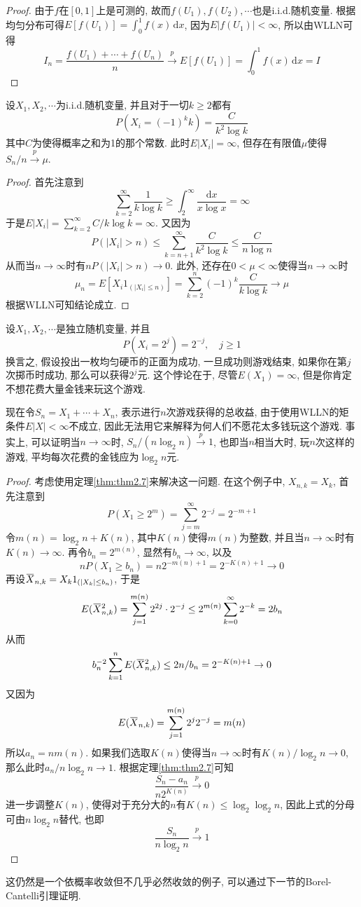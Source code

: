 \documentclass[cn, 12pt, math=mtpro2, bibstyle=apa, blue, twocol]{elegantbook}
\newcommand{\overbar}[1]{\mkern 1.5mu\overline{\mkern-1.5mu#1\mkern-1.5mu}\mkern 1.5mu}
\begin{document}
\begin{proof}
  由于$f$在$[0,1]$上是可测的, 故而$f(U_1),f(U_2),\cdots$也是i.i.d.随机变量. 根据均匀分布可得$E[f(U_1)]=\int_{0}^{1}f(x)\,\text{d}x$, 因为$E|f(U_1)|<\infty$, 所以由WLLN可得
  $$I_n=\frac{f(U_1)+\cdots+f(U_n)}{n}\xrightarrow{p} E[f(U_1)]=\int_{0}^{1}f(x)\,\text{d}x=I$$
\end{proof}
\begin{example}
设$X_1,X_2,\cdots$为i.i.d.随机变量, 并且对于一切$k\ge2$都有
$$P(X_i=(-1)^kk)=\frac{C}{k^2\log k}$$
其中$C$为使得概率之和为1的那个常数. 此时$E|X_i|=\infty$, 但存在有限值$\mu$使得$S_n/n\xrightarrow{p}\mu$.
\end{example}
\begin{proof}
  首先注意到
  $$\sum_{k=2}^{\infty}\frac{1}{k\log k}\geq \int_{2}^{\infty}\frac{\text{d}x}{x\log x}=\infty$$
  于是$E|X_i|=\sum_{k=2}^{\infty}C/k\log k=\infty$. 又因为
  $$P(|X_i|>n)\leq\sum_{k=n+1}^{\infty}\frac{C}{k^2\log k}\leq \frac{C}{n\log n}$$
  从而当$n\to\infty$时有$nP(|X_i|>n)\to0$. 此外, 还存在$0<\mu<\infty$使得当$n\to\infty$时
  $$\mu_n=E[X_i1_{(|X_i|\leq n)}]=\sum_{k=2}^{n}(-1)^k\frac{C}{k\log k}\to \mu$$
  根据WLLN可知结论成立.
\end{proof}

\begin{example}[圣彼得堡悖论]
设$X_1,X_2,\cdots$是独立随机变量, 并且
$$P(X_i=2^j)=2^{-j}, \quad j\ge1$$
换言之, 假设投出一枚均匀硬币的正面为成功, 一旦成功则游戏结束, 如果你在第$j$次掷币时成功, 那么可以获得$2^j$元. 这个悖论在于, 尽管$E(X_1)=\infty$, 但是你肯定不想花费大量金钱来玩这个游戏.

现在令$S_n=X_1+\cdots+X_n$, 表示进行$n$次游戏获得的总收益, 由于使用WLLN的矩条件$E|X|<\infty$不成立, 因此无法用它来解释为何人们不愿花太多钱玩这个游戏. 事实上, 可以证明当$n\to\infty$时, $S_n/ (n\log_2n)\xrightarrow{p}1$, 也即当$n$相当大时, 玩$n$次这样的游戏, 平均每次花费的金钱应为$\log_2n$元.
\end{example}
\begin{proof}
  考虑使用定理\ref{thm:thm2.7}来解决这一问题. 在这个例子中, $X_{n,k}=X_k$, 首先注意到
  $$P(X_1\geq 2^m)=\sum_{j=m}^{\infty}2^{-j}=2^{-m+1}$$
  令$m(n)=\log_2n+K(n)$, 其中$K(n)$使得$m(n)$为整数, 并且当$n\to\infty$时有$K(n)\to \infty$. 再令$b_n=2^{m(n)}$, 显然有$b_n\to\infty$, 以及
  $$nP(X_1\geq b_n)=n2^{-m(n)+1}=2^{-K(n)+1}\to 0$$
  再设$\overbar{X}_{n,k}=X_k1_{(|X_k|\leq b_n)}$, 于是
  $$E(\overbar{X}_{n,k}^2)=\sum_{j=1}^{m(n)}2^{2j}\cdot 2^{-j}\leq 2^{m(n)}\sum_{k=0}^{\infty}2^{-k}=2b_n$$
  从而
  $$b_n^{-2}\sum_{k=1}^{n}E(\overbar{X}_{n,k}^2)\leq 2n/b_n=2^{-K(n)+1}\to 0$$
  又因为
  $$E(\overbar{X}_{n,k})=\sum_{j=1}^{m(n)}2^j2^{-j}=m(n)$$
  所以$a_n=nm(n)$. 如果我们选取$K(n)$使得当$n\to\infty$时有$K(n)/\log_2n\to 0$, 那么此时$a_n/n\log_2n\to1$. 根据定理\ref{thm:thm2.7}可知
  $$\frac{S_n-a_n}{n2^{K(n)}}\xrightarrow{p} 0$$
  进一步调整$K(n)$, 使得对于充分大的$n$有$K(n)\leq \log_2\log_2n$, 因此上式的分母可由$n\log_2n$替代, 也即
  $$\frac{S_n}{n\log_2n}\xrightarrow{p}1$$
\end{proof}
\begin{remark}
这仍然是一个依概率收敛但不几乎必然收敛的例子, 可以通过下一节的Borel-Cantelli引理证明.
\end{remark}
\newpage
\end{document}

